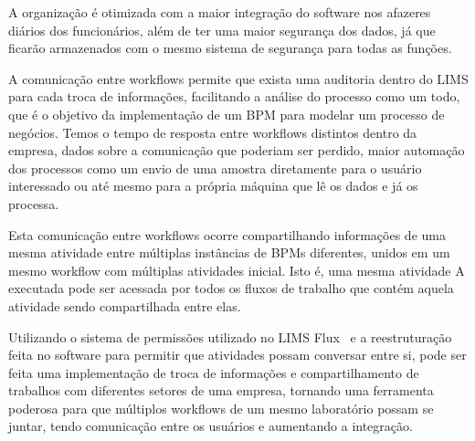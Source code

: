 A organização é otimizada com a maior integração do software nos afazeres diários dos funcionários, além de ter uma maior segurança dos dados, já que ficarão armazenados com o mesmo sistema de segurança para todas as funções.


A comunicação entre workflows permite que exista uma auditoria dentro do LIMS para cada troca de informações, facilitando a análise do processo como um todo, que é o objetivo da implementação de um BPM para modelar um processo de negócios. Temos o tempo de resposta entre workflows distintos dentro da empresa, dados sobre a comunicação que poderiam ser perdido, maior automação dos processos como um envio de uma amostra diretamente para o usuário interessado ou até mesmo para a própria máquina que lê os dados e já os processa.

Esta comunicação entre workflows ocorre compartilhando informações de uma mesma atividade entre múltiplas instâncias de BPMs diferentes, unidos em um mesmo workflow com múltiplas atividades inicial. Isto é, uma mesma atividade A executada pode ser acessada por todos os fluxos de trabalho que contém aquela atividade sendo compartilhada entre elas.

Utilizando o sistema de permissões utilizado no LIMS Flux~\cite{LucasAugustoFerreiraHanke2014DesenvolvimentoWorkflows} e a reestruturação feita no software para permitir que atividades possam conversar entre si, pode ser feita uma implementação de troca de informações e compartilhamento de trabalhos com diferentes setores de uma empresa, tornando uma ferramenta poderosa para que múltiplos workflows de um mesmo laboratório possam se juntar, tendo comunicação entre os usuários e aumentando a integração.